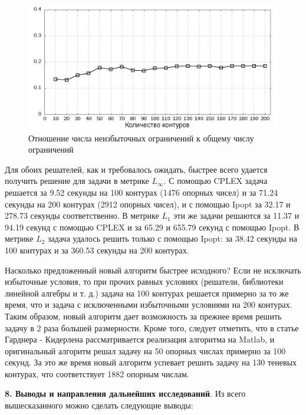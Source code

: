 \documentclass[a4paper, 10pt]{article}
\theoremstyle{definition}
\theoremstyle{plain}
\theoremstyle{plain}
\begin{document}
\begin{figure}[hh]
 \includegraphics[width=\textwidth]{images/Reduced-constraints-ratio-graph}
 \caption{Отношение числа неизбыточных ограничений к общему числу ограничений}
 \label{Reduced-constraints-ratio-graph}
\end{figure}

Для обоих решателей, как и требовалось ожидать, быстрее всего удается получить
решение для задачи в метрике $L_{\infty}$. С помощью CPLEX задача решается
за 9.52 секунды на 100 контурах (1476 опорных чисел) и за 71.24 секунды на 200
контурах (2912 опорных чисел), и с помощью Ipopt за 32.17 и 278.73 секунды
соответственно. В метрике $L_{1}$ эти же задачи решаются за 11.37 и 94.19 
секунд с помощью CPLEX и за 65.29 и 655.79 секунд с помощью Ipopt. В метрике
$L_{2}$ задача удалось решить только с помощью Ipopt: за 38.42 секунды
на 100 контурах и за 360.53 секунды на 200 контурах.

Насколько предложенный новый алгоритм быстрее исходного? Если не исключать
избыточные условия, то при прочих равных условиях (решатели, библиотеки линейной
алгебры и т. д.) задача на 100 контурах решается примерно за то же время, что
и задача с исключенными избыточными условиями на 200 контурах. Таким образом,
новый алгоритм дает возможность за прежнее время решить задачу в 2 раза большей
размерности. Кроме того, следует отметить, что в статье Гарднера - Кидерлена
рассматривается реализация алгоритма на Matlab, и оригинальный алгоритм
решал задачу на 50 опорных числах примерно за 100 секунд. За это же время
новый алгоритм успевает решить задачу на 130 теневых контурах, что соответствует
1882 опорным числам.

\textbf{8. Выводы и направления дальнейших исследований}. Из всего
вышесказанного можно сделать следующие выводы:
\end{document}
